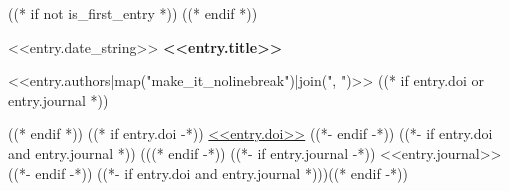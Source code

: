 ((* if not is_first_entry *))
\vspace{<<design.margins.entry_area.vertical_between>>}
((* endif *))

\begin{twocolentry}{
    <<entry.date_string>>
}
    \textbf{<<entry.title>>}

    \vspace{<<design.margins.highlights_area.vertical_between_bullet_points>>}

    <<entry.authors|map("make_it_nolinebreak")|join(", ")>>
    ((* if entry.doi or entry.journal *))
    \vspace{<<design.margins.highlights_area.vertical_between_bullet_points>>}

    ((* endif *))
    ((* if entry.doi -*))
    \href{<<entry.doi_url>>}{<<entry.doi>>}
    ((*- endif -*))
    ((*- if entry.doi and entry.journal *)) (((* endif -*))
    ((*- if entry.journal -*))
    <<entry.journal>>
    ((*- endif -*))
    ((*- if entry.doi and entry.journal *)))((* endif -*))

\end{twocolentry}
